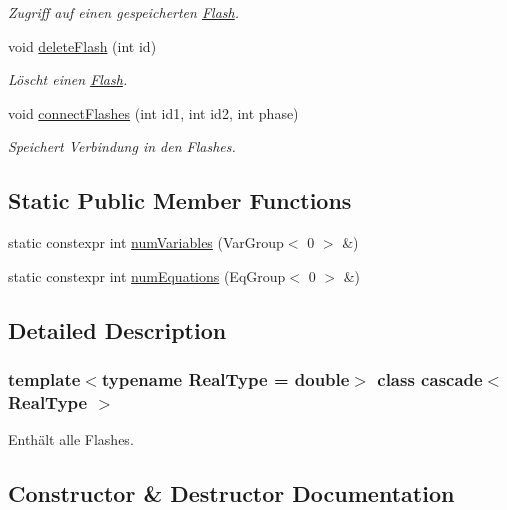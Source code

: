 \begin{DoxyCompactItemize}
\begin{DoxyCompactList}\small\item\em Zugriff auf einen gespeicherten \mbox{\hyperlink{class_flash}{Flash}}. \end{DoxyCompactList}\item 
void \mbox{\hyperlink{classcascade_ac1f72e57609f175e19422300f0332c81}{delete\+Flash}} (int id)
\begin{DoxyCompactList}\small\item\em Löscht einen \mbox{\hyperlink{class_flash}{Flash}}. \end{DoxyCompactList}\item 
void \mbox{\hyperlink{classcascade_a6c0ead85f1c6cae57bcf8e4494ab340c}{connect\+Flashes}} (int id1, int id2, int phase)
\begin{DoxyCompactList}\small\item\em Speichert Verbindung in den Flashes. \end{DoxyCompactList}\end{DoxyCompactItemize}
\subsection*{Static Public Member Functions}
\begin{DoxyCompactItemize}
\item 
static constexpr int \mbox{\hyperlink{classcascade_a437738f915a517f4fb76a848e94ec923}{num\+Variables}} (Var\+Group$<$ 0 $>$ \&)
\item 
static constexpr int \mbox{\hyperlink{classcascade_a9c6e6421737df16249a7198e8feda747}{num\+Equations}} (Eq\+Group$<$ 0 $>$ \&)
\end{DoxyCompactItemize}


\subsection{Detailed Description}
\subsubsection*{template$<$typename Real\+Type = double$>$\newline
class cascade$<$ Real\+Type $>$}

Enthält alle Flashes. 

\subsection{Constructor \& Destructor Documentation}
\mbox{\label{classcascade_ac437f03d454f773e195b4528cce89cc9}} 
